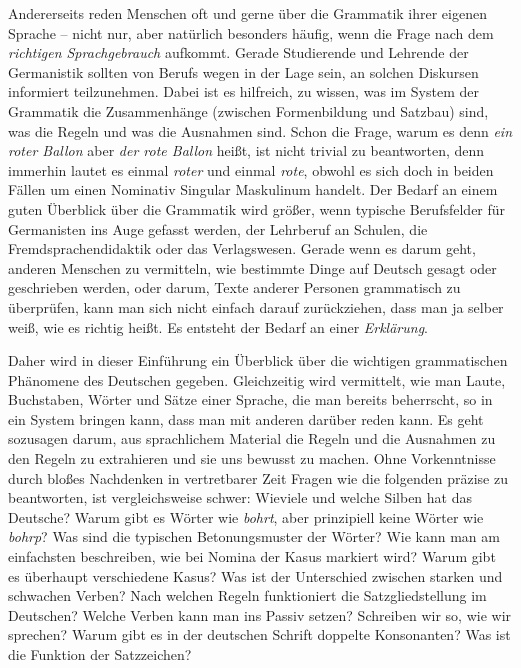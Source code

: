 Andererseits reden Menschen oft und gerne über die Grammatik ihrer eigenen Sprache -- nicht nur, aber natürlich besonders häufig, wenn die Frage nach dem \textit{richtigen Sprachgebrauch} aufkommt.
Gerade Studierende und Lehrende der Germanistik sollten von Berufs wegen in der Lage sein, an solchen Diskursen informiert teilzunehmen.
Dabei ist es hilfreich, zu wissen, was im System der Grammatik die Zusammenhänge (\zB zwischen Formenbildung und Satzbau) sind, was die Regeln und was die Ausnahmen sind.
Schon die Frage, warum es denn \textit{ein roter Ballon} aber \textit{der rote Ballon} heißt, ist nicht trivial zu beantworten, denn immerhin lautet es einmal \textit{roter} und einmal \textit{rote}, obwohl es sich doch in beiden Fällen um einen Nominativ Singular Maskulinum handelt.
Der Bedarf an einem guten Überblick über die Grammatik wird größer, wenn typische Berufsfelder für Germanisten ins Auge gefasst werden, \zB der Lehrberuf an Schulen, die Fremdsprachendidaktik oder das Verlagswesen.
Gerade wenn es darum geht, anderen Menschen zu vermitteln, wie bestimmte Dinge auf Deutsch gesagt oder geschrieben werden, oder darum, Texte anderer Personen grammatisch zu überprüfen, kann man sich nicht einfach darauf zurückziehen, dass man ja selber weiß, wie es richtig heißt.
Es entsteht der Bedarf an einer \textit{Erklärung}.

Daher wird in dieser Einführung ein Überblick über die wichtigen grammatischen Phänomene des Deutschen gegeben.
Gleichzeitig wird vermittelt, wie man Laute, Buchstaben, Wörter und Sätze einer Sprache, die man bereits beherrscht, so in ein System bringen kann, dass man mit anderen darüber reden kann.
Es geht sozusagen darum, aus sprachlichem Material die Regeln und die Ausnahmen zu den Regeln zu extrahieren und sie uns bewusst zu machen.
Ohne Vorkenntnisse durch bloßes Nachdenken in vertretbarer Zeit Fragen wie die folgenden präzise zu beantworten, ist vergleichsweise schwer:
Wieviele und welche Silben hat das Deutsche?
Warum gibt es Wörter wie \textit{bohrt}, aber prinzipiell keine Wörter wie \textit{bohrp}?
Was sind die typischen Betonungsmuster der Wörter?
Wie kann man am einfachsten beschreiben, wie bei Nomina der Kasus markiert wird?
Warum gibt es überhaupt verschiedene Kasus?
Was ist der Unterschied zwischen starken und schwachen Verben?
Nach welchen Regeln funktioniert die Satzgliedstellung im Deutschen?
Welche Verben kann man ins Passiv setzen?
Schreiben wir so, wie wir sprechen?
Warum gibt es in der deutschen Schrift doppelte Konsonanten?
Was ist die Funktion der Satzzeichen?

